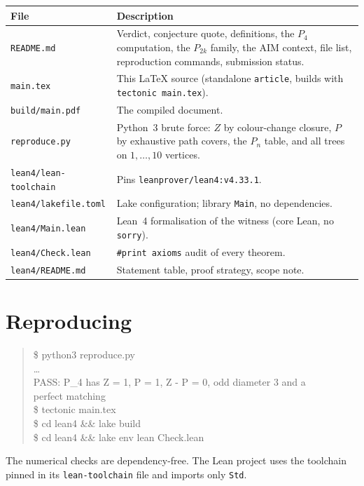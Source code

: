 \documentclass[11pt]{article}
\theoremstyle{definition}
\theoremstyle{remark}
\begin{document}
\begin{center}
\begin{tabular}{l|p{11cm}}
File & Description \\
\hline
\texttt{README.md} & Verdict, conjecture quote, definitions, the $P_4$ computation, the $P_{2k}$ family, the AIM context, file list, reproduction commands, submission status. \\
\texttt{main.tex} & This LaTeX source (standalone \texttt{article}, builds with \texttt{tectonic main.tex}). \\
\texttt{build/main.pdf} & The compiled document. \\
\texttt{reproduce.py} & Python~3 brute force: $Z$ by colour-change closure, $P$ by exhaustive path covers, the $P_n$ table, and all trees on $1,\dots,10$ vertices. \\
\texttt{lean4/lean-toolchain} & Pins \texttt{leanprover/lean4:v4.33.1}. \\
\texttt{lean4/lakefile.toml} & Lake configuration; library \texttt{Main}, no dependencies. \\
\texttt{lean4/Main.lean} & Lean~4 formalisation of the witness (core Lean, no \texttt{sorry}). \\
\texttt{lean4/Check.lean} & \texttt{\#print axioms} audit of every theorem. \\
\texttt{lean4/README.md} & Statement table, proof strategy, scope note. \\
\end{tabular}
\end{center}

\section{Reproducing}

\begin{quote}\small\ttfamily
\$ python3 reproduce.py\\
\dots\\
PASS: P\_4 has Z = 1, P = 1, Z - P = 0, odd diameter 3 and a\\
perfect matching\\
\$ tectonic main.tex\\
\$ cd lean4 \&\& lake build\\
\$ cd lean4 \&\& lake env lean Check.lean
\end{quote}

\noindent
The numerical checks are dependency-free. The Lean project uses the toolchain
pinned in its \texttt{lean-toolchain} file and imports only \texttt{Std}.
\end{document}
